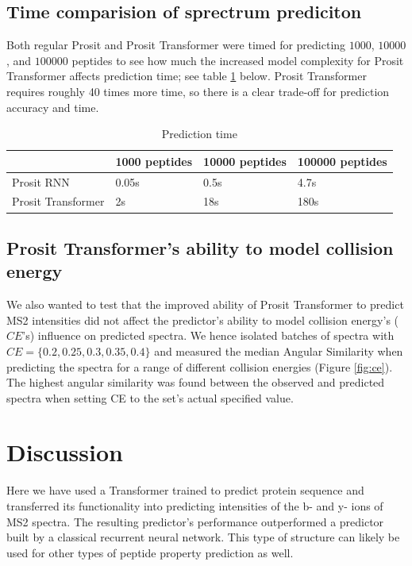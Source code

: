 \documentclass[10pt,a4paper]{article}
\begin{document}
\subsection*{Time comparision of sprectrum prediciton}

Both regular Prosit and Prosit Transformer were timed for predicting $1000$, $10000$, and $100000$ peptides to see how much the increased model complexity for Prosit Transformer affects prediction time; see table \ref{tab:predictionTime} below. Prosit Transformer requires roughly 40 times more time, so there is a clear trade-off for prediction accuracy and time.

\begin{table}[htbp]
    \centering
    \caption{Prediction time}
      \begin{tabular}{l|lll}
      \toprule
            & 1000 peptides & 10000 peptides & 100000 peptides \\
      \midrule
      Prosit RNN & 0.05s & 0.5s  & 4.7s \\
      Prosit Transformer & 2s    & 18s   & 180s \\
      \end{tabular}%
    \label{tab:predictionTime}%
  \end{table}%
  

\subsection*{Prosit Transformer’s ability to model collision energy}

    
We also wanted to test that the improved ability of Prosit Transformer to predict MS2 intensities did not affect the predictor’s ability to model collision energy’s ($\textit{CE}$’s) influence on predicted spectra. We hence isolated batches of spectra with $\textit{CE}=\{0.2, 0.25, 0.3, 0.35, 0.4\}$ and measured the median Angular Similarity when predicting the spectra for a range of different collision energies (Figure \ref{fig:ce}). The highest angular similarity was found between the observed and predicted spectra when setting CE to the set’s actual specified value.

\section*{Discussion}
Here we have used a Transformer trained to predict protein sequence and transferred its functionality into predicting intensities of the b- and y- ions of MS2 spectra. The resulting predictor’s performance outperformed a predictor built by a classical recurrent neural network. This type of structure can likely be used for other types of peptide property prediction as well.
\end{document}
